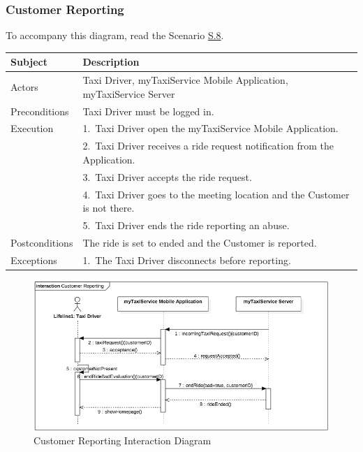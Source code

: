 \subsubsection{Customer Reporting}
			To accompany this diagram, read the Scenario \hyperref[sec:CustomerReportingScenario]{S.8}.

				\begin{table}[htpb]
					\centering
					\label{tab:CustomerReportingDiagramTable}
					\begin{tabularx}{\textwidth}{lp{9cm}}
						\hline
						\hline
							\textbf{Subject}
						& 
							\textbf{Description}\\
						\hline
							Actors	       &  Taxi Driver, myTaxiService Mobile Application, myTaxiService Server\\
						\hline
							Preconditions  &  Taxi Driver must be logged in.\\
						\hline
							Execution      &  1.~Taxi Driver open the myTaxiService Mobile Application.\\
										   &  2.~Taxi Driver receives a ride request notification from the Application.\\
										   &  3.~Taxi Driver accepts the ride request.\\
										   &  4.~Taxi Driver goes to the meeting location and the Customer is not there.\\
										   &  5.~Taxi Driver ends the ride reporting an abuse.\\
						\hline
							Postconditions &  The ride is set to ended and the Customer is reported.\\
						\hline
							Exceptions     &  1.~The Taxi Driver disconnects before reporting.\\
									
						\hline
						\hline
					\end{tabularx}
				\end{table}
				
				\begin{figure}[H]
					\centering
					\includegraphics[width=\textwidth, scale=0.5]{IMG/InteractionDiagrams/CustomerReporting.png}
					\caption{Customer Reporting Interaction Diagram}\label{sec:FigureCustomerReporting}
				\end{figure}